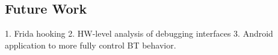 \documentclass[journal]{IEEEtran}
\begin{document}
\subsection{Future Work}

        1. Frida hooking
        2. HW-level analysis of debugging interfaces
        3. Android application to more fully control BT behavior.

%
%



%
%
\end{document}
